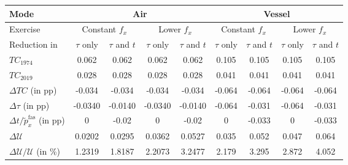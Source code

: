 \begin{tabular}{l|c|c|c|c||c|c|c|c}
Mode & \multicolumn{4}{|c||}{Air} & \multicolumn{4}{c}{Vessel} \\ \hline
Exercise &  \multicolumn{2}{|c|}{Constant $f_x$} &  \multicolumn{2}{|c||}{Lower $f_x$} & \multicolumn{2}{|c|}{Constant $f_x$} &  \multicolumn{2}{|c|}{Lower $f_x$} \\ \hline
Reduction in & $\tau$ only & $\tau$ and $t$ &$\tau$ only & $\tau$ and $t$ & $\tau$ only & $\tau$ and $t$ &$\tau$ only & $\tau$ and $t$\\ \hline
$TC_{1974}$ & 0.062 & 0.062 & 0.062 & 0.062 & 0.105 & 0.105 & 0.105 & 0.105\\
$TC_{2019}$ &  0.028 & 0.028 & 0.028 & 0.028&  0.041 & 0.041 & 0.041 & 0.041\\
$\Delta TC$ (in pp) &  -0.034 & -0.034 & -0.034 & -0.034 & -0.064 & -0.064 & -0.064 & -0.064\\
$\Delta \tau$ (in pp) & -0.0340	&-0.0140&	-0.0340&	-0.0140	&-0.064&	-0.031&	-0.064&	-0.031  \\
$\Delta t/\widetilde{p}_x^{\text{fas}}$ (in pp) & 0&	-0.02&	0&	-0.02&	0&	-0.033&	0&	-0.033  \\ \hline
$\Delta \mathcal{U}$ & 0.0202&	0.0295	&0.0362&	0.0527	&0.035&	0.052	&0.047&	0.064 \\
$\Delta \mathcal{U}/\mathcal{U}$ (in \%) & 1.2319&	1.8187&	2.2073	&3.2477	&2.179	&3.295&	2.872&	4.052   \\
\hline
\end{tabular} 